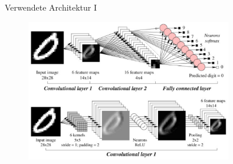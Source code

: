 \documentclass[10pt]{beamer}
\begin{document}
\begin{frame}{Verwendete Architektur I}
\begin{figure}[h]
 \centering
 \includegraphics[width=0.8\textwidth]{images/cnn.pdf}
\end{figure}
\end{frame}
\end{document}
